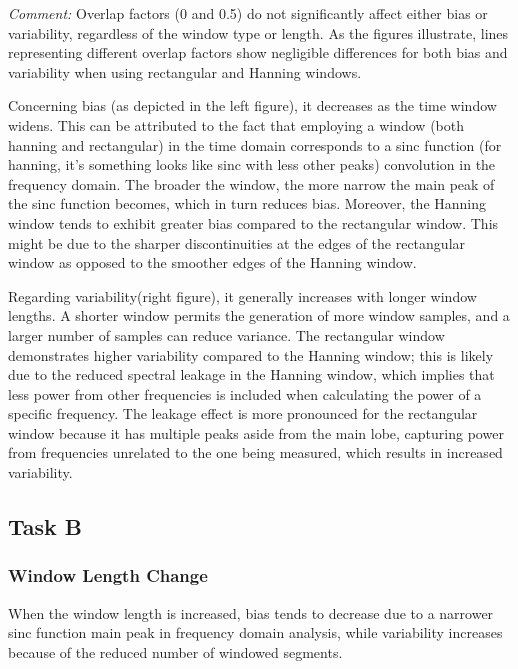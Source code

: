 \documentclass[8pt]{article}  %
\theoremstyle{plain}
\theoremstyle{definition}
\theoremstyle{remark}
\begin{document}
    \textit{Comment: }
    Overlap factors (0 and 0.5) do not significantly affect either bias or variability, 
    regardless of the window type or length. 
    As the figures illustrate, 
    lines representing different overlap factors show negligible differences 
    for both bias and variability when using rectangular and Hanning windows.

    Concerning bias (as depicted in the left figure), 
    it decreases as the time window widens. 
    This can be attributed to the fact that 
    employing a window (both hanning and rectangular) in the time domain 
    corresponds to a sinc function (for hanning, it's something looks like sinc with less other peaks) convolution in the frequency domain. 
    The broader the window, 
    the more narrow the main peak of the sinc function becomes, 
    which in turn reduces bias. 
    Moreover, 
    the Hanning window tends to exhibit greater bias compared to the rectangular window. 
    This might be due to the sharper discontinuities at the edges of the rectangular window 
    as opposed to the smoother edges of the Hanning window.

    Regarding variability(right figure), 
    it generally increases with longer window lengths. 
    A shorter window permits the generation of more window samples, 
    and a larger number of samples can reduce variance. 
    The rectangular window demonstrates higher variability compared to the Hanning window; 
    this is likely due to the reduced spectral leakage in the Hanning window, 
    which implies that less power from other frequencies is included when calculating the power of a specific frequency. 
    The leakage effect is more pronounced for the rectangular window 
    because it has multiple peaks aside 
    from the main lobe, 
    capturing power from frequencies unrelated to the one being measured, 
    which results in increased variability.

    \subsection{Task B}
    \subsubsection{Window Length Change}
    When the window length is increased, 
    bias tends to decrease due to a narrower sinc function main peak in frequency domain analysis, 
    while variability increases because of the reduced number of windowed segments.
\end{document}

